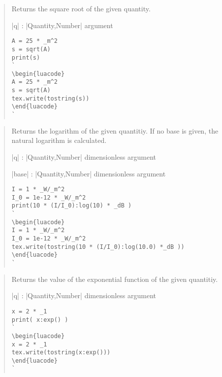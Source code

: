 \documentclass{ltxdoc}
\begin{document}
\begin{quote}
  Returns the square root of the given quantity.

  \begin{description}
  \item |q| : |Quantity,Number| argument
  \end{description}


\begin{lstlisting}
A = 25 * _m^2
s = sqrt(A)
print(s)
`
\begin{luacode}
A = 25 * _m^2
s = sqrt(A)
tex.write(tostring(s))
\end{luacode}
`
\end{lstlisting}
\end{quote}



\begin{quote}
  Returns the logarithm of the given quantitiy. If no base is given, the natural logarithm is calculated.

  \begin{description}
  \item |q| : |Quantity,Number| dimensionless argument
  \item |base| : |Quantity,Number| dimensionless argument
  \end{description}


\begin{lstlisting}
I = 1 * _W/_m^2
I_0 = 1e-12 * _W/_m^2
print(10 * (I/I_0):log(10) * _dB )
`
\begin{luacode}
I = 1 * _W/_m^2
I_0 = 1e-12 * _W/_m^2
tex.write(tostring(10 * (I/I_0):log(10.0) *_dB ))
\end{luacode}
`
\end{lstlisting}
\end{quote}




\begin{quote}
  Returns the value of the exponential function of the given quantitiy.

  \begin{description}
  \item |q| : |Quantity,Number| dimensionless argument
  \end{description}

\begin{lstlisting}
x = 2 * _1
print( x:exp() )
`
\begin{luacode}
x = 2 * _1
tex.write(tostring(x:exp()))
\end{luacode}
`
\end{lstlisting}

\end{quote}
\end{document}
